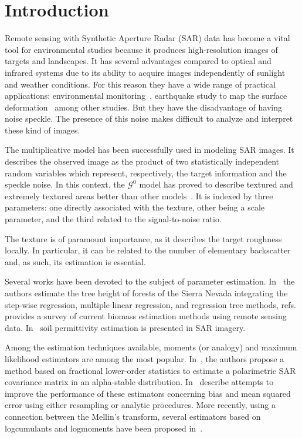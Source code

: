 \documentclass[twocolumn]{svjour3}
\begin{document}
	\section{Introduction}
	\label{intro}
	Remote sensing with Synthetic Aperture Radar (SAR) data has become a vital tool for environmental studies because it produces high-resolution images of targets and landscapes. It  has  several  advantages  compared  to  optical  and  infrared systems due to its ability to acquire images independently of sunlight and weather conditions. For this reason they have a wide range of practical applications: environmental monitoring~\cite{White1991,Brisco2013}, earthquake study to map the surface deformation~\cite{Yinghui2017} among other studies.  
	But they have  the disadvantage of having noise speckle. The presence of this noise makes difficult to analyze and interpret these kind of images.
	
	The multiplicative model has been successfully used in modeling SAR images. It describes the observed image as the product of two statistically independent random variables which represent, respectively, the target information and the speckle noise. In this context, the $\mathcal{G}^0$ model has proved to describe textured and extremely textured areas better than other models~\cite{Frery97,MejailJacoboFreryBustos:IJRS}. It is indexed by three parameters: one directly associated with the texture, other being a scale parameter, and the third related to the signal-to-noise ratio.
	
	The texture is of paramount importance, as it describes the target roughness locally.
	In particular, it can be related to the number of elementary backscatter and, as such, its estimation is essential.
	
	Several works have been devoted to the subject of parameter estimation. In~\cite{Su2016} the authors estimate the tree height of forests of the Sierra Nevada integrating the step-wise regression, multiple linear regression, and regression tree methods, refs.~\cite{Lu2016} provides a survey of current biomass estimation methods using remote sensing data. In~\cite{AlvarezLopez2017} soil permittivity estimation is presented in SAR imagery.
	
	Among the estimation techniques available, moments (or analogy) and maximum likelihood estimators are among the most popular. In~\cite{Bian2013}, the authors propose a method based on fractional lower-order statistics to estimate a polarimetric SAR covariance matrix in an alpha-stable distribution.
	In~\cite{VasconcellosFrerySilva:CompStat,CribariFrerySilva:CSDA} describe attempts to improve the performance of these estimators concerning bias and mean squared error using either resampling or analytic procedures. 
	More recently, using a connection between the Mellin's transform, several estimators based on logcumulants and logmoments have been proposed in~\cite{MellinAnalysisPolSAR,BujorTrouveValetNicolas2004,khan2014}. 
	
\end{document}
